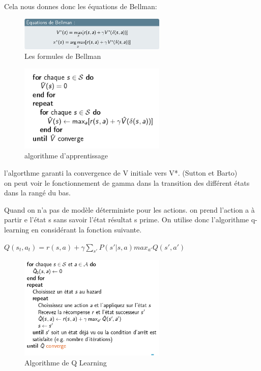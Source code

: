 \documentclass[oneside]{book}
\begin{document}
Cela nous donnes donc les équations de Bellman:\\

\begin{figure}[!ht]
\centering
\includegraphics[width = 7cm]{formule_bellman.png}
\caption{Les formules de Bellman}
\end{figure}

\begin{figure}[!ht]
\centering
\includegraphics[width = 7cm]{algo_renforcement.png}
\caption{algorithme d'apprentissage}
\end{figure}

l'algorthme garanti la convergence de V initiale vers V*. (Sutton et Barto)\\

on peut voir le fonctionnement de gamma dans la transition des différent états dans la rangé du bas.

Quand on n'a pas de modèle déterministe pour les actions. on prend l'action a à partir e l'état s sans savoir l'état résultat s prime. On utilise donc l'algorithme q-learning en considérant la fonction suivante.

\centering
$Q(s_t,a_t) = r(s,a) + \gamma \sum\limits_{s'} P(s' | s,a) max_{a'} Q(s',a')$\\
\justify

\begin{figure}[!ht]
\centering
\includegraphics[width = 7cm]{algo_qlearning.png}
\caption{Algorithme de Q Learning}
\end{figure}
\end{document}
